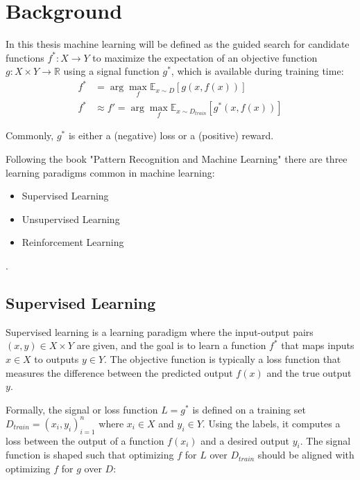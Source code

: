 
\chapter{Background}
\label{chapter:Background}
In this thesis machine learning will be defined as the guided search for candidate functions $f^*: X \to Y$ to maximize the expectation of an objective function 
${g: X \times Y \to \mathbb{R}}$ using a signal function $g^*$, which is available during training time:
\begin{equation}
    \label{general_learning_paradigm}
    \begin{aligned}
        f^* &= \arg\max_{f} \mathbb{E}_{x \sim D}[g(x,f(x))] \\
        f^* &\approx f' = \arg\max_{f} \mathbb{E}_{x \sim D_{train}}[g^*(x,f(x))]
    \end{aligned}
\end{equation}

Commonly, $g^*$ is either a (negative) loss or a (positive) reward.

Following the book "Pattern Recognition and Machine Learning" \cite{bishop} there are three learning paradigms common in machine learning: 
\begin{itemize}
	\item Supervised Learning
	\item Unsupervised Learning
	\item Reinforcement Learning
\end{itemize} .

\section{Supervised Learning}
\label{section:super_learn}
Supervised learning is a learning paradigm where the input-output pairs $(x,y) \in X \times Y$ are given, and the goal is to learn a function 
$f^*$ that maps inputs $x \in X$ to outputs $y \in Y$. The objective function is typically a loss function that measures the difference between 
the predicted output $f(x)$ and the true output $y$.

Formally, the signal or loss function $L = g^*$ is defined on a training set $D_{train} = {(x_i,y_i)}_{i=1}^n$ where $x_i \in X$ and $y_i \in Y$. Using the 
labels, it computes a loss between the output of a function $f(x_i)$ and a desired output $y_i$. The signal function is shaped such that optimizing $f$ for $L$ 
over $D_{train}$ should be aligned with optimizing $f$ for $g$ over $D$:

